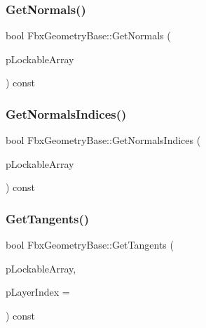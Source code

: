 \subsubsection{\texorpdfstring{Get\+Normals()}{GetNormals()}}
{\footnotesize\ttfamily bool Fbx\+Geometry\+Base\+::\+Get\+Normals (\begin{DoxyParamCaption}\item[{\hyperlink{class_fbx_layer_element_array_template}{Fbx\+Layer\+Element\+Array\+Template}$<$ \hyperlink{class_fbx_vector4}{Fbx\+Vector4} $>$ $\ast$$\ast$}]{p\+Lockable\+Array }\end{DoxyParamCaption}) const}

\mbox{\label{class_fbx_geometry_base_ace44c4c25817ccabcf32e4c5b3b32936}} 
\subsubsection{\texorpdfstring{Get\+Normals\+Indices()}{GetNormalsIndices()}}
{\footnotesize\ttfamily bool Fbx\+Geometry\+Base\+::\+Get\+Normals\+Indices (\begin{DoxyParamCaption}\item[{\hyperlink{class_fbx_layer_element_array_template}{Fbx\+Layer\+Element\+Array\+Template}$<$ int $>$ $\ast$$\ast$}]{p\+Lockable\+Array }\end{DoxyParamCaption}) const}

\mbox{\label{class_fbx_geometry_base_aa8b22c9380e8c8be64855a6409136210}} 
\subsubsection{\texorpdfstring{Get\+Tangents()}{GetTangents()}}
{\footnotesize\ttfamily bool Fbx\+Geometry\+Base\+::\+Get\+Tangents (\begin{DoxyParamCaption}\item[{\hyperlink{class_fbx_layer_element_array_template}{Fbx\+Layer\+Element\+Array\+Template}$<$ \hyperlink{class_fbx_vector4}{Fbx\+Vector4} $>$ $\ast$$\ast$}]{p\+Lockable\+Array,  }\item[{const int}]{p\+Layer\+Index = {} }\end{DoxyParamCaption}) const}


